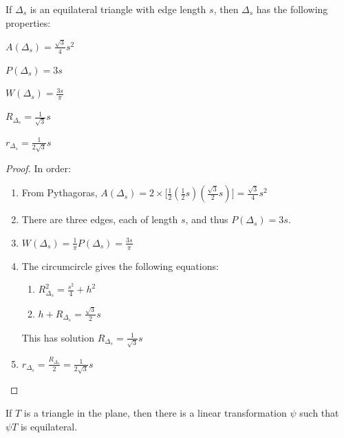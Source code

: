 \documentclass[crop=false,class=book,oneside]{standalone}
\begin{document}
            \begin{theorem}
            If $\Delta_s$ is an equilateral triangle with edge length $s$, then $\Delta_s$ has the following properties:
            \begin{enumerate}
            \begin{multicols}{5}
            \item $A(\Delta_s) = \frac{\sqrt{3}}{4}s^2$
            \item $P(\Delta_s) = 3s$
            \item $W(\Delta_s) = \frac{3s}{\pi}$
            \item $R_{\Delta_s} = \frac{1}{\sqrt{3}}s$
            \item $r_{\Delta_s} = \frac{1}{2\sqrt{3}}s$
            \end{multicols}
            \end{enumerate}
            \end{theorem}
            \begin{proof}
            In order:
            \begin{enumerate}
                \item From Pythagoras, $A(\Delta_s) =2\times\big[\frac{1}{2}(\frac{1}{2}s)(\frac{\sqrt{3}}{2}s)\big] = \frac{\sqrt{3}}{4}s^2$
                \item There are three edges, each of length $s$, and thus $P(\Delta_s) = 3s$.
                \item $W(\Delta_s) = \frac{1}{\pi}P(\Delta_s) = \frac{3s}{\pi}$
                \item The circumcircle gives the following equations:
                \begin{enumerate}
                    \item $R_{\Delta_s}^2=\frac{s^2}{4}+h^2$
                    \item $h+R_{\Delta_s} = \frac{\sqrt{3}}{2}s$
                \end{enumerate}
                This has solution $R_{\Delta_s}=\frac{1}{\sqrt{3}}s$
                \item $r_{\Delta_s} = \frac{R_{\Delta_s}}{2}= \frac{1}{2\sqrt{3}}s$
            \end{enumerate}
            \end{proof}
            \begin{theorem}
            If $T$ is a triangle in the plane, then there is a linear transformation $\psi$ such that $\psi T$ is equilateral.
            \end{theorem}
\end{document}
